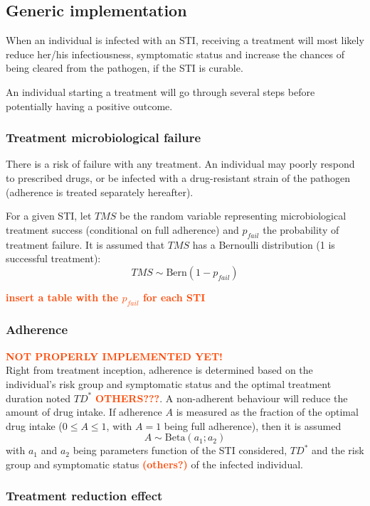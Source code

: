 \documentclass[11pt, onecolumn]{article}
\newcommand{\warning}[1]{\textbf{\textcolor{OrangeRed}{#1}}}
\begin{document}
\subsection{Generic implementation}

When an individual is infected with an STI, receiving a treatment will most likely reduce her/his infectiousness, symptomatic status and increase the chances of being cleared from the pathogen, if the STI is curable.

An individual starting a treatment will go through several steps before potentially having a positive outcome. 

\subsubsection{Treatment microbiological failure}

There is a risk of failure with any treatment. An individual may poorly respond to prescribed drugs, or be infected with a drug-resistant strain of the pathogen (adherence is treated separately hereafter).

For a given STI, let $TMS$ be the random variable representing microbiological treatment success (conditional on full adherence) and $p_{fail}$ the probability of treatment failure. It is assumed that $TMS$ has a Bernoulli distribution (1 is successful treatment):
$$TMS \sim \mathrm{Bern}(1- p_{fail})$$

\warning{insert a table with the $p_{fail}$ for each STI}

\subsubsection{Adherence}
\warning{NOT PROPERLY IMPLEMENTED YET!}\\
Right from treatment inception, adherence is determined based on the individual's risk group and symptomatic status and the optimal treatment duration noted $TD^*$ \warning{OTHERS???}. A non-adherent behaviour will reduce the amount of drug intake. If adherence $A$ is measured as the fraction of the optimal drug intake ($0 \leq A\leq 1$, with $A=1$ being full adherence), then it is assumed
$$ A \sim \mathrm{Beta}(a_1; a_2)$$
with $a_1$ and $a_2$ being parameters function of the STI considered, $TD^*$ and the risk group and symptomatic status \warning{(others?)} of the infected individual.


\subsubsection{Treatment reduction effect}
\end{document}
